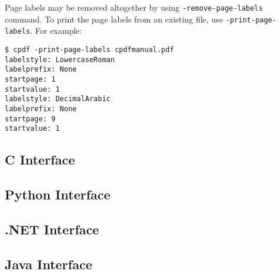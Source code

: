 \documentclass{book}
\begin{document}
Page labels may be removed altogether by using \texttt{-remove-page-labels} command. To print the page labels from an existing file, use \texttt{-print-page-labels}. For example:
\begin{framed}\small\begin{verbatim}$ cpdf -print-page-labels cpdfmanual.pdf
labelstyle: LowercaseRoman
labelprefix: None
startpage: 1
startvalue: 1
labelstyle: DecimalArabic
labelprefix: None
startpage: 9
startvalue: 1
\end{verbatim}
\end{framed}\pagestyle{empty}\thispagestyle{fancy}

\begin{cpdflib}
\clearpage
\section*{C Interface}
\begin{small}\tt

\end{small}
\end{cpdflib}

\begin{pycpdflib}
\clearpage
\section*{Python Interface}
\begin{small}\tt

\end{small}
\end{pycpdflib}

\begin{dotnetcpdflib}
\clearpage
\section*{.NET Interface}
\begin{small}\tt

\end{small}
\end{dotnetcpdflib}

\begin{jcpdflib}
\clearpage
\section*{Java Interface}
\begin{small}\tt

\end{small}
\end{jcpdflib}
\end{document}
